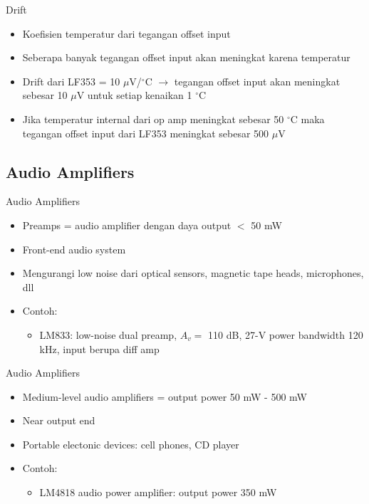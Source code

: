 \begin{frame}{Drift}
	\begin{itemize}
		\item Koefisien temperatur dari tegangan offset input
		\item Seberapa banyak tegangan offset input akan meningkat karena temperatur
		\item Drift dari LF353 = 10 $ \mu $V/$ ^{\circ} $C $ \rightarrow $ tegangan offset input akan meningkat sebesar 10 $ \mu $V untuk setiap kenaikan 1 $ ^\circ $C
		\item Jika temperatur internal dari op amp meningkat sebesar 50 $ ^{\circ} $C maka tegangan offset input dari LF353 meningkat sebesar 500 $\mu$V
	\end{itemize}
\end{frame}

\subsection{Audio Amplifiers}
\begin{frame}{Audio Amplifiers}
	\begin{itemize}
		\item Preamps = audio amplifier dengan daya output $ < $ 50 mW
		\item Front-end audio system
		\item Mengurangi low noise dari optical sensors, magnetic tape heads, microphones, dll
		\item Contoh:
		\begin{itemize}
			\item LM833: low-noise dual preamp, $ A_v =$ 110 dB, 27-V power bandwidth 120 kHz, input berupa diff amp
		\end{itemize}
	\end{itemize}
\end{frame}

\begin{frame}{Audio Amplifiers}
	\begin{itemize}
		\item Medium-level audio amplifiers = output power 50 mW - 500 mW
		\item Near output end
		\item Portable electonic devices: cell phones, CD player
		\item Contoh:
		\begin{itemize}
			\item LM4818 audio power amplifier: output power 350 mW
		\end{itemize}
	\end{itemize}
\end{frame}

